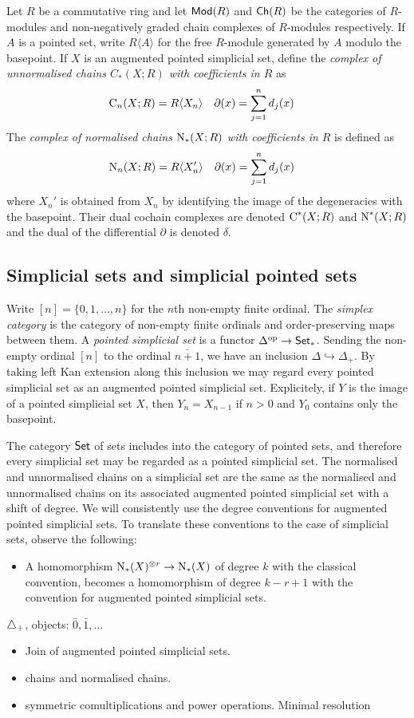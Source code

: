 Let $R$ be a commutative ring and let $\mathsf{Mod}(R)$ and $\mathsf{Ch}(R)$ be the categories of $R$-modules and non-negatively graded chain complexes of $R$-modules respectively. If $A$ is a pointed set, write $R\langle A\rangle$ for the free $R$-module generated by $A$ modulo the basepoint. If $X$ is an augmented pointed simplicial set, define the \emph{complex of unnormalised chains $C_*(X;R)$ with coefficients in $R$} as
\begin{align*}
\operatorname{C}_n(X;R) &= R\langle X_n\rangle 
&
\partial(x) &= \sum_{j=1}^n d_j(x)
\end{align*}
The \emph{complex of normalised chains $\operatorname{N}_*(X;R)$ with coefficients in $R$} is defined as 
\begin{align*}
\operatorname{N}_n(X;R) &= R\langle X_n'\rangle 
&
\partial(x) &= \sum_{j=1}^n d_j(x)
\end{align*}
where $X_n'$ is obtained from $X_n$ by identifying the image of the degeneracies with the basepoint. Their dual cochain complexes are denoted $\operatorname{C}^*(X;R)$ and $\operatorname{N}^*(X;R)$ and the dual of the differential $\partial$ is denoted $\delta$.
\subsection{Simplicial sets and simplicial pointed sets} Write $[n] = \{0,1,\ldots,n\}$ for the $n$th non-empty finite ordinal. The \emph{simplex category} is the category of non-empty finite ordinals and order-preserving maps between them. A \emph{pointed simplicial set} is a functor $\Delta^{\mathrm{op}}\to \mathsf{Set}_*$. Sending the non-empty ordinal $[n]$ to the ordinal $\overline{n+1}$, we have an inclusion $\Delta\hookrightarrow \Delta_+$. By taking left Kan extension along this inclusion we may regard every pointed simplicial set as an augmented pointed simplicial set. Explicitely, if $Y$ is the image of a pointed simplicial set $X$, then $Y_n = X_{n-1}$ if $n>0$ and $Y_0$ contains only the basepoint. 

The category $\mathsf{Set}$ of sets includes into the category of pointed sets, and therefore every simplicial set may be regarded as a pointed simplicial set. The normalised and unnormalised chains on a simplicial set are the same as the normalised and unnormalised chains on its associated augmented pointed simplicial set with a shift of degree. We will consistently use the degree conventions for augmented pointed simplicial sets. To translate these conventions to the case of simplicial sets, observe the following:
\begin{itemize}
    \item A homomorphism $\operatorname{N}_*(X)^{\otimes r}\to \operatorname{N}_*(X)$ of degree $k$ with the classical convention, becomes a homomorphism of degree $k-r+1$ with the convention for augmented pointed simplicial sets.
\end{itemize}


$\triangle_+$, objects: $\bar{0}, \bar{1}, \dots$
\begin{itemize}
    \item Join of augmented pointed simplicial sets.
    \item chains and normalised chains.
    \item symmetric comultiplications and power operations. Minimal resolution
\end{itemize}